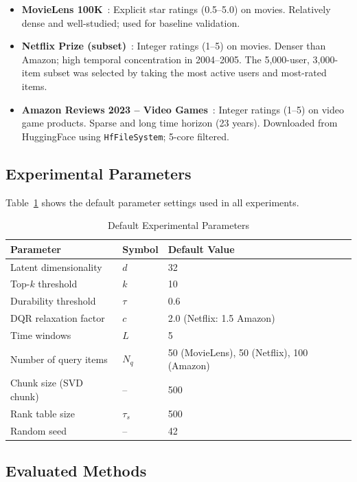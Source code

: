 \begin{itemize}
  \item \textbf{MovieLens 100K}~\cite{harper2016movielens}: Explicit star ratings (0.5--5.0) on movies. Relatively dense and well-studied; used for baseline validation.
  \item \textbf{Netflix Prize (subset)}~\cite{bennett2007netflix}: Integer ratings (1--5) on movies. Denser than Amazon; high temporal concentration in 2004--2005. The 5{,}000-user, 3{,}000-item subset was selected by taking the most active users and most-rated items.
  \item \textbf{Amazon Reviews 2023 -- Video Games}~\cite{hou2024bridging}: Integer ratings (1--5) on video game products. Sparse and long time horizon (23 years). Downloaded from HuggingFace using \texttt{HfFileSystem}; 5-core filtered.
\end{itemize}

\subsection{Experimental Parameters}

Table~\ref{tab:params} shows the default parameter settings used in all experiments.

\begin{table}[htbp]
\centering
\caption{Default Experimental Parameters}
\label{tab:params}
\begin{tabular}{lll}
\toprule
\textbf{Parameter} & \textbf{Symbol} & \textbf{Default Value} \\
\midrule
Latent dimensionality & $d$       & 32 \\
Top-$k$ threshold     & $k$       & 10 \\
Durability threshold  & $\tau$    & 0.6 \\
DQR relaxation factor & $c$       & 2.0 (Netflix: 1.5 Amazon) \\
Time windows          & $L$       & 5 \\
Number of query items & $N_q$     & 50 (MovieLens), 50 (Netflix), 100 (Amazon) \\
Chunk size (SVD chunk)& --        & 500 \\
Rank table size       & $\tau_s$  & 500 \\
Random seed           & --        & 42 \\
\bottomrule
\end{tabular}
\end{table}

\subsection{Evaluated Methods}

